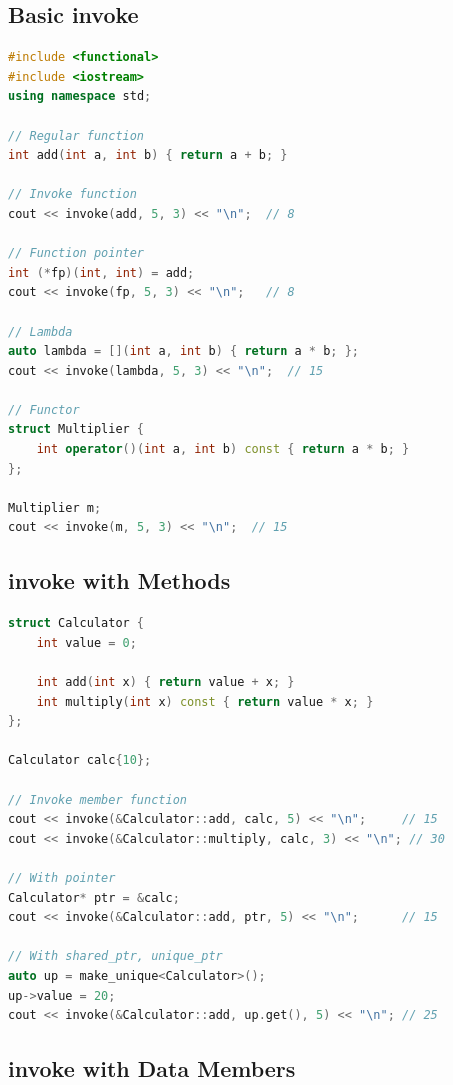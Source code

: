 \hypertarget{basic-invoke}{%
\subsection{Basic invoke}\label{basic-invoke}}

\begin{lstlisting}[language={C++}]
#include <functional>
#include <iostream>
using namespace std;

// Regular function
int add(int a, int b) { return a + b; }

// Invoke function
cout << invoke(add, 5, 3) << "\n";  // 8

// Function pointer
int (*fp)(int, int) = add;
cout << invoke(fp, 5, 3) << "\n";   // 8

// Lambda
auto lambda = [](int a, int b) { return a * b; };
cout << invoke(lambda, 5, 3) << "\n";  // 15

// Functor
struct Multiplier {
    int operator()(int a, int b) const { return a * b; }
};

Multiplier m;
cout << invoke(m, 5, 3) << "\n";  // 15
\end{lstlisting}

\hypertarget{invoke-with-methods}{%
\subsection{invoke with Methods}\label{invoke-with-methods}}

\begin{lstlisting}[language={C++}]
struct Calculator {
    int value = 0;
    
    int add(int x) { return value + x; }
    int multiply(int x) const { return value * x; }
};

Calculator calc{10};

// Invoke member function
cout << invoke(&Calculator::add, calc, 5) << "\n";     // 15
cout << invoke(&Calculator::multiply, calc, 3) << "\n"; // 30

// With pointer
Calculator* ptr = &calc;
cout << invoke(&Calculator::add, ptr, 5) << "\n";      // 15

// With shared_ptr, unique_ptr
auto up = make_unique<Calculator>();
up->value = 20;
cout << invoke(&Calculator::add, up.get(), 5) << "\n"; // 25
\end{lstlisting}

\hypertarget{invoke-with-data-members}{%
\subsection{invoke with Data Members}\label{invoke-with-data-members}}

